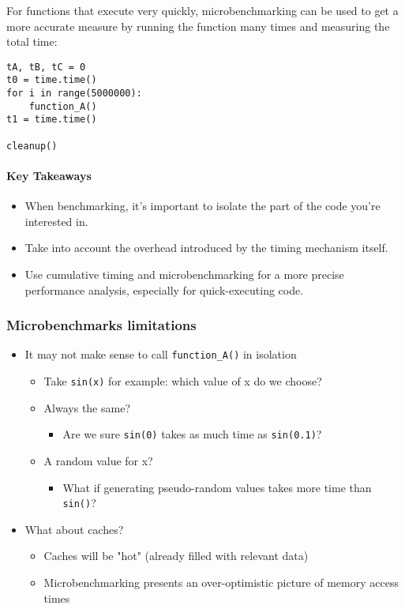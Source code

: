 \documentclass[12pt]{article}
\begin{document}
For functions that execute very quickly, microbenchmarking can be used to get a more accurate measure by running the function many times and measuring the total time:

\begin{verbatim}
tA, tB, tC = 0
t0 = time.time()
for i in range(5000000):
    function_A()
t1 = time.time()

cleanup()
\end{verbatim}

\paragraph{Key Takeaways}
\begin{itemize}
    \item When benchmarking, it's important to isolate the part of the code you're interested in.
    \item Take into account the overhead introduced by the timing mechanism itself.
    \item Use cumulative timing and microbenchmarking for a more precise performance analysis, especially for quick-executing code.
\end{itemize}

\subsubsection{Microbenchmarks limitations}

\begin{itemize}
    \item It may not make sense to call \texttt{function\_A()} in isolation
    \begin{itemize}
        \item Take \texttt{sin(x)} for example: which value of x do we choose?
        \item Always the same?
        \begin{itemize}
            \item Are we sure \texttt{sin(0)} takes as much time as \texttt{sin(0.1)}?
        \end{itemize}
        \item A random value for x?
        \begin{itemize}
            \item What if generating pseudo-random values takes more time than \texttt{sin()}?
        \end{itemize}
    \end{itemize}
    \item What about caches?
    \begin{itemize}
        \item Caches will be "hot" (already filled with relevant data)
        \item Microbenchmarking presents an over-optimistic picture of memory access times
    \end{itemize}
\end{itemize}
\end{document}
